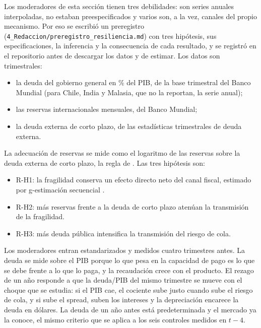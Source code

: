 Los moderadores de esta sección tienen tres debilidades: son series anuales interpoladas, no estaban preespecificados y varios son, a la vez, canales del propio mecanismo. Por eso se escribió un preregistro (\texttt{4\_Redaccion/preregistro\_resiliencia.md}) con tres hipótesis, sus especificaciones, la inferencia y la consecuencia de cada resultado, y se registró en el repositorio antes de descargar los datos y de estimar. Los datos son trimestrales:
\begin{itemize}
    \item la deuda del gobierno general en \% del PIB, de la base trimestral del Banco Mundial (para Chile, India y Malasia, que no la reportan, la serie anual);
    \item las reservas internacionales mensuales, del Banco Mundial;
    \item la deuda externa de corto plazo, de las estadísticas trimestrales de deuda externa.
\end{itemize}
La adecuación de reservas se mide como el logaritmo de las reservas sobre la deuda externa de corto plazo, la regla de \citet{Greenspan1999}. Las tres hipótesis son:
\begin{itemize}
    \item R-H1: la fragilidad conserva un efecto directo neto del canal fiscal, estimado por g-estimación secuencial \citep{AcharyaBlackwellSen2016}.
    \item R-H2: más reservas frente a la deuda de corto plazo atenúan la transmisión de la fragilidad.
    \item R-H3: más deuda pública intensifica la transmisión del riesgo de cola.
\end{itemize}
Los moderadores entran estandarizados y medidos cuatro trimestres antes. La deuda se mide sobre el PIB porque lo que pesa en la capacidad de pago es lo que se debe frente a lo que lo paga, y la recaudación crece con el producto. El rezago de un año responde a que la deuda/PIB del mismo trimestre se mueve con el choque que se estudia: si el PIB cae, el cociente sube justo cuando sube el riesgo de cola, y si sube el spread, suben los intereses y la depreciación encarece la deuda en dólares. La deuda de un año antes está predeterminada y el mercado ya la conoce, el mismo criterio que se aplica a los seis controles medidos en $t-4$.

